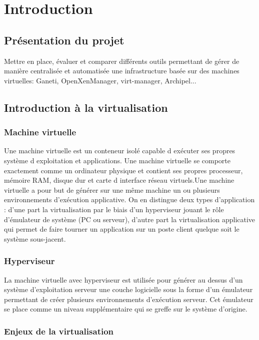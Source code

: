 \chapter{Introduction}
\section{Présentation du projet}
Mettre en place, évaluer et comparer différents outils permettant de gérer de manière
centralisée et automatisée une infrastructure basée sur des machines virtuelles: Ganeti,
OpenXenManager, virt-manager, Archipel...
\section{Introduction à la virtualisation}
\subsection{Machine virtuelle}


Une machine virtuelle est un conteneur isolé capable d exécuter
ses propres système d exploitation et applications.
Une machine virtuelle se comporte exactement comme un ordinateur physique
et contient ses propres processeur, mémoire RAM, disque dur et carte
d interface réseau virtuels.Une machine virtuelle
a pour but de générer sur une même machine un ou plusieurs environnements
d'exécution applicative. On en distingue deux types d'application
: d'une part la virtualisation par le biais d'un hyperviseur jouant
le rôle d'émulateur de système (PC ou serveur), d'autre part la virtualisation
applicative qui permet de faire tourner un application sur un poste
client quelque soit le système sous-jacent.

\subsection{Hyperviseur }


La machine virtuelle avec hyperviseur est utilisée pour générer au
dessus d'un système d'exploitation serveur une couche logicielle sous
la forme d'un émulateur permettant de créer plusieurs environnements
d'exécution serveur. Cet émulateur se place comme un niveau supplémentaire qui se greffe sur le système d'origine.
\newpage
\subsection{Enjeux de la virtualisation}


